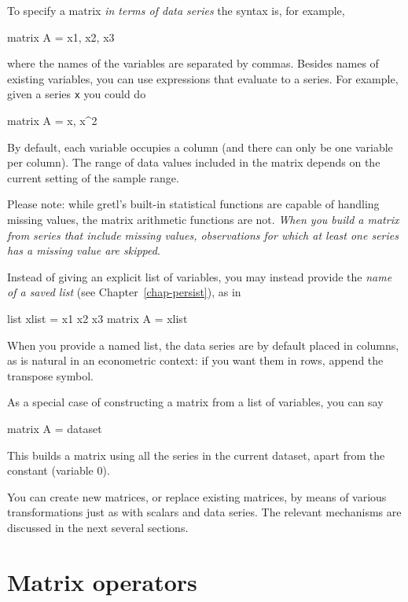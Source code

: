 To specify a matrix \textit{in terms of data series} the syntax is,
for example,
%
\begin{code}
matrix A = { x1, x2, x3 }
\end{code}
%
where the names of the variables are separated by commas.  Besides
names of existing variables, you can use expressions that evaluate to
a series.  For example, given a series \texttt{x} you could do
%
\begin{code}
matrix A = { x, x^2 }
\end{code}
%
By default, each variable occupies a column (and there can only be one
variable per column).  The range of data values included in the matrix
depends on the current setting of the sample range.

Please note: while gretl's built-in statistical functions are
capable of handling missing values, the matrix arithmetic functions
are not.  \emph{When you build a matrix from series that include missing
values, observations for which at least one series has a missing value
are skipped}.  

Instead of giving an explicit list of variables, you may instead
provide the \textit{name of a saved list} (see
Chapter~\ref{chap-persist}), as in
%
\begin{code}
list xlist = x1 x2 x3
matrix A = { xlist }
\end{code}
%
When you provide a named list, the data series are by default placed
in columns, as is natural in an econometric context: if you want them
in rows, append the transpose symbol.

As a special case of constructing a matrix from a list of variables,
you can say
%
\begin{code}
matrix A = { dataset }
\end{code}
%
This builds a matrix using all the series in the current dataset,
apart from the constant (variable 0).

You can create new matrices, or replace existing matrices, by means of
various transformations just as with scalars and data series.  The
relevant mechanisms are discussed in the next several sections.


\section{Matrix operators}
\label{matrix-op}

